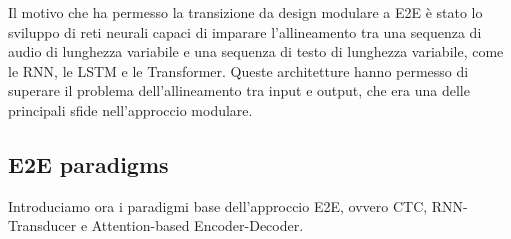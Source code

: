 \documentclass[12pt, a4paper]{article}
\begin{document}
Il motivo che ha permesso la transizione da design modulare a E2E è stato lo sviluppo di reti neurali capaci di imparare l'allineamento tra una sequenza di audio di lunghezza variabile e una sequenza di testo di lunghezza variabile, come le RNN, le LSTM e le Transformer. Queste architetture hanno permesso di superare il problema dell'allineamento tra input e output, che era una delle principali sfide nell'approccio modulare.
\vspace{0.5em}

\subsection{E2E paradigms}

Introduciamo ora i paradigmi base dell'approccio E2E, ovvero CTC, RNN-Transducer e Attention-based Encoder-Decoder.
\end{document}
